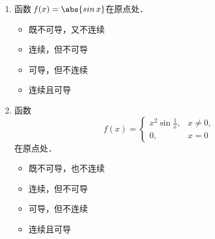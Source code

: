 \documentclass[a4paper,punct=CCT]{ctexbook}
\theoremstyle{definition}
\theoremstyle{remark}
\newif\ifshowsol
\begin{document}
\begin{enumerate}
  \ifshowsol
  函数\(f\)显然在此处左连续，所以有\(f'_-(1) = \paren[\big]{\frac23 x^3}'\big\vert_1 = 2x^2\big\vert_1 = 2\)．又因为\(f(1) = 2/3 \ne 1 = f_-(1)\)，函数\(f\)显然不是右连续的，因此也不是右可导的．
  \fi

\item 函数\(\,f(x) = \abs{\sin x}\)在原点处\uline{\hspace{8em}}．
  \begin{itemize}
    \renewcommand{\labelitemi}{\faCircleThin}
  \item 既不可导，又不连续
    \ifshowsol
  \item[\faCircle]
    \else
  \item
    \fi
    连续，但不可导
  \item 可导，但不连续
  \item 连续且可导
  \end{itemize}

  \ifshowsol
  因为\(f_-(0) = -\sin_-0 = 0 = \sin_+0 = f_+(0)\)且\(f(0) = 0\)，所以它在原点处连续．又因为~\(f'_-(0) = -\sin'_-0 = -1 \ne 1 = \sin'_+0 = f'_+(0)\)，所以它在原点处不可导．
  \fi

\item \label{B1.4.1.E4}函数
  \begin{equation*}
    f(x) =
    \begin{cases}
      x^2 \sin\frac1x, & x \ne 0, \\
      0, & x = 0
    \end{cases}
  \end{equation*}
  在原点处\uline{\hspace{8em}}．
  \begin{itemize}
    \renewcommand{\labelitemi}{\faCircleThin}
  \item 既不可导，也不连续
  \item 连续，但不可导
  \item 可导，但不连续
    \ifshowsol
  \item[\faCircle]
    \else
  \item
    \fi
    连续且可导
  \end{itemize}

  \ifshowsol
  根据定理~\ref{thm:deriv2cont}，可导则连续．又有
  \begin{equation*}
    f'(0)
    = \lim_{\fdx\to0} \frac{\fwdf\,f(0)}{\fdx}
    = \lim_{\fdx\to0} \frac{\,f(\fdx)}{\fdx}
    = \lim_{\fdx\to0} \frac{\fdx^2 \sin\frac1\fdx}{\fdx}
    = \lim_{\fdx\to0} \fdx \sin\frac1\fdx
    = 0.
  \end{equation*}
  \fi


\end{enumerate}
\end{document}
